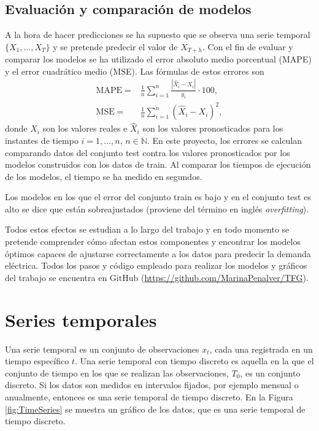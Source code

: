 \documentclass[12pt,twoside]{article}
\newcommand{\abs}[1]{\ensuremath{|#1|}}
\begin{document}
\subsection{Evaluación y comparación de modelos}
A la hora de hacer predicciones se ha supuesto que se observa una serie temporal $\{X_1, \dotsc, X_T\}$ y se pretende predecir el valor de $X_{T+h}$. Con el fin de evaluar y comparar los modelos se ha utilizado el error absoluto medio porcentual (MAPE) y el error cuadrático medio (MSE). Las fórmulas de estos errores son
\begin{align*}
    \text{MAPE} \;=&\; \frac{1}{n}\sum_{i=1}^{n} \frac{\abs{\hat{X}_i - X_i}}{y_i}\cdot 100, \\
    \text{MSE} \;=&\; \frac{1}{n}\sum_{i=1}^n (\hat{X}_i - X_i)^2,
\end{align*}
donde $X_i$ son los valores reales e $\hat{X}_i$ son los valores pronosticados para los instantes de tiempo $i=1,\dotsc, n$, $n\in \mathbb{N}$. En este proyecto, los errores se calculan comparando datos del conjunto test contra los valores pronosticados por los modelos construidos con los datos de train. Al comparar los tiempos de ejecución de los modelos, el tiempo se ha medido en segundos.

Los modelos en los que el error del conjunto train es bajo y en el conjunto test es alto se dice que están sobreajustados (proviene del término en inglés \emph{overfitting}).




Todos estos efectos se estudian a lo largo del trabajo y en todo momento se pretende comprender cómo afectan estos componentes y encontrar los modelos óptimos capaces de ajustarse correctamente a los datos para predecir la demanda eléctrica. Todos los pasos y código empleado para realizar los modelos y gráficos del trabajo se encuentra en GitHub (\href{https://github.com/MarinaPenalver/TFG}{https://github.com/MarinaPenalver/TFG}).







\newpage
\section{Series temporales}
Una serie temporal es un conjunto de observaciones $x_t$, cada una registrada en un tiempo específico $t$. Una serie temporal con tiempo discreto es aquella en la que el conjunto de tiempo en los que se realizan las observaciones, $T_0$, es un conjunto discreto. Si los datos son medidos en intervalos fijados, por ejemplo mensual o anualmente, entonces es una serie temporal de tiempo discreto. En la Figura \ref{fig:TimeSeries} se muestra un gráfico de los datos, que es una serie temporal de tiempo discreto.
\end{document}

